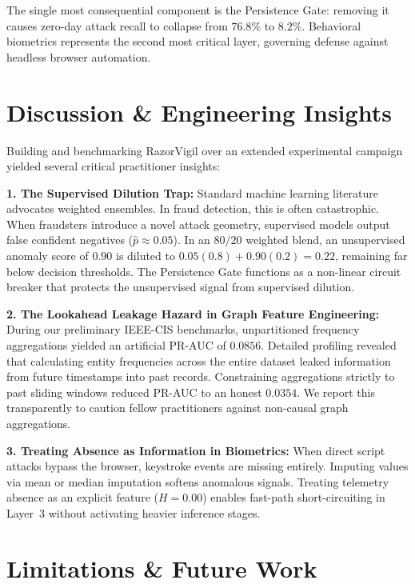\documentclass[conference]{IEEEtran}
\begin{document}
The single most consequential component is the Persistence Gate: removing it causes zero-day attack recall to collapse from $76.8\%$ to $8.2\%$. Behavioral biometrics represents the second most critical layer, governing defense against headless browser automation.

\section{Discussion \& Engineering Insights}
\label{sec:discussion}

Building and benchmarking RazorVigil over an extended experimental campaign yielded several critical practitioner insights:

\textbf{1. The Supervised Dilution Trap:} Standard machine learning literature advocates weighted ensembles. In fraud detection, this is often catastrophic. When fraudsters introduce a novel attack geometry, supervised models output false confident negatives ($\hat{p} \approx 0.05$). In an $80/20$ weighted blend, an unsupervised anomaly score of $0.90$ is diluted to $0.05(0.8) + 0.90(0.2) = 0.22$, remaining far below decision thresholds. The Persistence Gate functions as a non-linear circuit breaker that protects the unsupervised signal from supervised dilution.

\textbf{2. The Lookahead Leakage Hazard in Graph Feature Engineering:} During our preliminary IEEE-CIS benchmarks, unpartitioned frequency aggregations yielded an artificial PR-AUC of $0.0856$. Detailed profiling revealed that calculating entity frequencies across the entire dataset leaked information from future timestamps into past records. Constraining aggregations strictly to past sliding windows reduced PR-AUC to an honest $0.0354$. We report this transparently to caution fellow practitioners against non-causal graph aggregations.

\textbf{3. Treating Absence as Information in Biometrics:} When direct script attacks bypass the browser, keystroke events are missing entirely. Imputing values via mean or median imputation softens anomalous signals. Treating telemetry absence as an explicit feature ($H = 0.00$) enables fast-path short-circuiting in Layer~3 without activating heavier inference stages.

\section{Limitations \& Future Work}
\label{sec:limitations}
\end{document}
